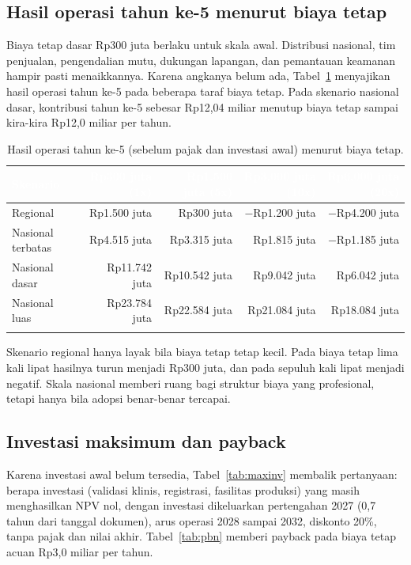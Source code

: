 \documentclass[11pt,a4paper]{article}
\newcommand{\tH}[1]{\textcolor{white}{\sffamily\bfseries\small #1}}
\newcommand{\tabstart}{\small\rowcolors{2}{white}{pale}\arrayrulecolor{rule}}
\newcommand{\hdrrow}{\rowcolor{tealdark}}
\renewcommand{\toprule}{\arrayrulecolor{tealdark}\specialrule{0.9pt}{0pt}{0pt}\arrayrulecolor{rule}}
\renewcommand{\bottomrule}{\arrayrulecolor{tealdark}\specialrule{0.9pt}{0pt}{0pt}\arrayrulecolor{rule}}
\begin{document}
\subsection{Hasil operasi tahun ke-5 menurut biaya tetap}

Biaya tetap dasar Rp300 juta berlaku untuk skala awal. Distribusi nasional, tim penjualan, pengendalian mutu, dukungan lapangan, dan pemantauan keamanan hampir pasti menaikkannya. Karena angkanya belum ada, Tabel~\ref{tab:fcsens} menyajikan hasil operasi tahun ke-5 pada beberapa taraf biaya tetap. Pada skenario nasional dasar, kontribusi tahun ke-5 sebesar Rp12,04 miliar menutup biaya tetap sampai kira-kira Rp12,0 miliar per tahun.

\begin{table}[htbp]
\centering
\caption{Hasil operasi tahun ke-5 (sebelum pajak dan investasi awal) menurut biaya tetap.}
\label{tab:fcsens}
\tabstart
\begin{tabular}{@{}lrrrr@{}}
\toprule
\hdrrow\tH{Skenario} & \tH{Rp300 juta (1x)} & \tH{Rp1.500 juta (5x)} & \tH{Rp3.000 juta (10x)} & \tH{Rp6.000 juta (20x)} \\
\midrule
Regional & Rp1.500 juta & Rp300 juta & $-$Rp1.200 juta & $-$Rp4.200 juta \\
Nasional terbatas & Rp4.515 juta & Rp3.315 juta & Rp1.815 juta & $-$Rp1.185 juta \\
Nasional dasar & Rp11.742 juta & Rp10.542 juta & Rp9.042 juta & Rp6.042 juta \\
Nasional luas & Rp23.784 juta & Rp22.584 juta & Rp21.084 juta & Rp18.084 juta \\
\bottomrule
\end{tabular}
\end{table}

\begin{catatan}[Temuan]
Skenario regional hanya layak bila biaya tetap tetap kecil. Pada biaya tetap lima kali lipat hasilnya turun menjadi Rp300 juta, dan pada sepuluh kali lipat menjadi negatif. Skala nasional memberi ruang bagi struktur biaya yang profesional, tetapi hanya bila adopsi benar-benar tercapai.
\end{catatan}

\subsection{Investasi maksimum dan payback}

Karena investasi awal belum tersedia, Tabel~\ref{tab:maxinv} membalik pertanyaan: berapa investasi (validasi klinis, registrasi, fasilitas produksi) yang masih menghasilkan NPV nol, dengan investasi dikeluarkan pertengahan 2027 (0,7 tahun dari tanggal dokumen), arus operasi 2028 sampai 2032, diskonto 20\%, tanpa pajak dan nilai akhir. Tabel~\ref{tab:pbn} memberi payback pada biaya tetap acuan Rp3,0 miliar per tahun.
\end{document}
